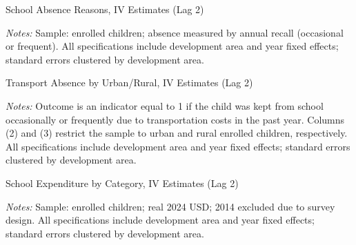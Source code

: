 \documentclass[12pt]{article}
\newcommand*{\TableLagTwoPath}{../Paper_3_Tables/Lagged_2Year_Tables}
\begin{document}
	\begin{table}[H]
	\centering
	\begin{adjustbox}{max width=\linewidth, center}
	\begin{threeparttable}
		\caption{School Absence Reasons, IV Estimates (Lag 2)}
		\label{tab:absence_reasons_lag2}
		{\small}
		\begin{tablenotes}
			\small
			\item \textit{Notes:} Sample: enrolled children; absence measured by annual recall (occasional or frequent). All specifications include development area and year fixed effects; standard errors clustered by development area.
		\end{tablenotes}
	\end{threeparttable}
	\end{adjustbox}
	\end{table}
	\begin{table}[H]
	\centering
	\begin{adjustbox}{max width=\linewidth, center}
	\begin{threeparttable}
		\caption{Transport Absence by Urban/Rural, IV Estimates (Lag 2)}
		\label{tab:rural_attendance_lag2}
		{\small}
		\begin{tablenotes}
			\small
			\item \textit{Notes:} Outcome is an indicator equal to 1 if the child was kept from school occasionally or frequently due to transportation costs in the past year. Columns (2) and (3) restrict the sample to urban and rural enrolled children, respectively. All specifications include development area and year fixed effects; standard errors clustered by development area.
		\end{tablenotes}
	\end{threeparttable}
	\end{adjustbox}
	\end{table}
	\begin{table}[H]
	\centering
	\begin{adjustbox}{max width=\linewidth, center}
	\begin{threeparttable}
		\caption{School Expenditure by Category, IV Estimates (Lag 2)}
		\label{tab:expenditures_level_lag2}
		{\small}
		\begin{tablenotes}
			\small
			\item \textit{Notes:} Sample: enrolled children; real 2024 USD; 2014 excluded due to survey design. All specifications include development area and year fixed effects; standard errors clustered by development area.
		\end{tablenotes}
	\end{threeparttable}
	\end{adjustbox}
	\end{table}
\end{document}
